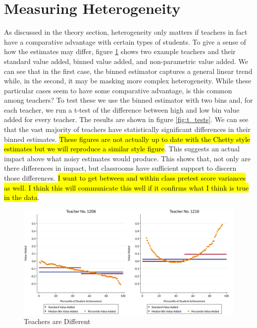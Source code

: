 \documentclass[12pt]{article}
\theoremstyle{definition}
\theoremstyle{definition}
\theoremstyle{definition}
\theoremstyle{definition}
\begin{document}
\section{Measuring Heterogeneity} \label{hetva}

    As discussed in the theory section, heterogeneity only matters if teachers in fact have a comparative advantage with certain types of students. To give a sense of how the estimates may differ, figure \ref{fig_teacher_examples}  shows two example teachers and their standard value added, binned value added, and non-parametric value added. We can see that in the first case,  the binned estimator captures a general linear trend while, in the second, it may be masking more complex heterogeneity. While these particular cases seem to have some comparative advantage, is this common among teachers? To test these we use the binned estimator with two bins and, for each teacher, we run a t-test of the difference between high and low bin value added for every teacher. The results are shown in figure \ref{fig:t_tests}. We can see that the vast majority of teachers have statistically significant differences in their binned estimates. \hl{These figures are not actually up to date with the Chetty style estimates but we will reproduce a similar style figure}. This suggests an actual impact above what noisy estimates would produce. This shows that, not only are there differences in impact, but classrooms have sufficient support to discern those differences. \hl{I want to get between and within class pretest score variances as well. I think this will communicate this well if it confirms what I think is true in the data}. 

    \begin{figure}[H]
        \begin{center}
        \includegraphics[width=.85\textwidth]{Working_Paper/WP_Figures/fig1_heterogeneity.pdf}
        \end{center}
            \caption{Teachers are Different}
               \label{fig_teacher_examples}
    \end{figure}
\end{document}
